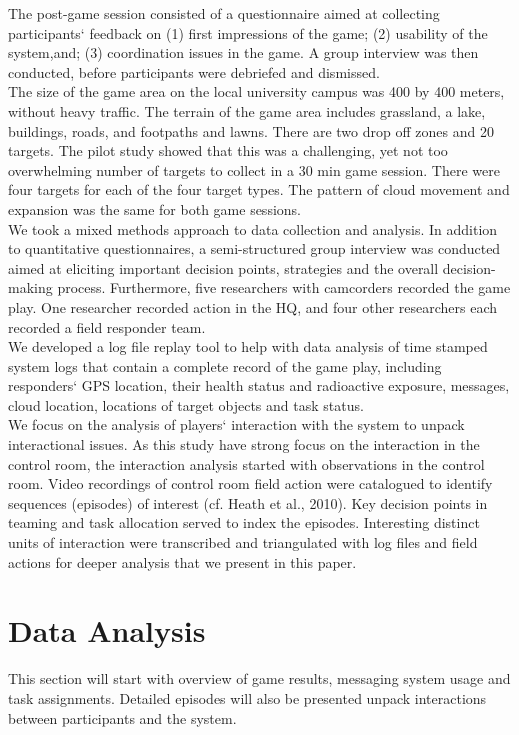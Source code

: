 The post-game session consisted of a questionnaire aimed at collecting participants` feedback on (1) first impressions of the game; (2) usability of the system,and; (3) coordination issues in the game. A group interview was then conducted, before participants were debriefed and dismissed.\\

The size of the game area on the local university campus was 400 by 400 meters, without heavy traffic. The terrain of the game area includes grassland, a lake, buildings, roads, and footpaths and lawns. There are two drop off zones and 20 targets. The pilot study showed that this was a challenging, yet not too overwhelming number of targets to collect in a 30 min game session. There were four targets for each of the four target types. The pattern of cloud movement and expansion was the same for both game sessions.\\

We took a mixed methods approach to data collection and analysis. In addition to quantitative questionnaires, a semi-structured group interview was conducted aimed at eliciting important decision points, strategies and the overall decision-making process. Furthermore, five researchers with camcorders recorded the game play. One researcher recorded action in the HQ, and four other researchers each recorded a field responder team.\\

We developed a log file replay tool to help with data analysis of time stamped system logs that contain a complete record of the game play, including responders` GPS location, their health status and radioactive exposure, messages, cloud location, locations of target objects and task status.\\

We focus on the analysis of players` interaction with the system to unpack interactional issues. As this study have strong focus on the interaction in the control room, the interaction analysis started with observations in the control room. Video recordings of control room field action were catalogued to identify sequences (episodes) of interest (cf. Heath et al., 2010). Key decision points in teaming and task allocation served to index the episodes. Interesting distinct units of interaction were transcribed and triangulated with log files and field actions for deeper analysis that we present in this paper.\\


\section{Data Analysis}
This section will start with overview of game results, messaging system usage and task assignments. Detailed episodes will also be presented unpack interactions between participants and the system.\\

